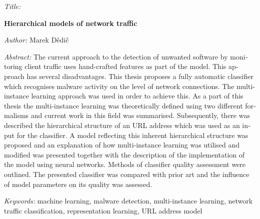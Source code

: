 \begin{english}
	\begin{onehalfspace}
		\noindent \textit{Title:}

		\noindent \textbf{Hierarchical models of network traffic}
	\end{onehalfspace}

	\bigskip

	\noindent \textit{Author:} Marek Dědič

	\bigskip

	\noindent \textit{Abstract:}
	\textenglish{The current approach to the detection of unwanted software by monitoring client traffic uses hand-crafted features as part of the model. This approach has several disadvantages. This thesis proposes a fully automatic classifier which recognises malware activity on the level of network connections. The multi-instance learning approach was used in order to achieve this. As a part of this thesis the multi-instance learning was theoretically defined using two different formalisms and current work in this field was summarised. Subsequently, there was described the hierarchical structure of an URL address which was used as an input for the classifier. A model reflecting this inherent hierarchical structure was proposed and an explanation of how multi-instance learning was utilised and modified was presented together with the description of the implementation of the model using neural networks. Methods of classifier quality assessment were outlined. The presented classifier was compared with prior art and the influence of model parameters on its quality was assessed.}

	\bigskip

	\noindent \textit{Keywords:}
	\textenglish{machine learning, malware detection, multi-instance learning, network traffic classification, representation learning, URL address model}

\end{english}
